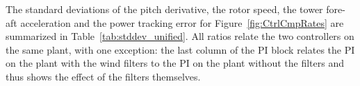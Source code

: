 
The standard deviations of the pitch derivative, the rotor speed, the tower fore-aft acceleration and the power tracking error for Figure~\ref{fig:CtrlCmpRates} are summarized in Table~\ref{tab:stddev_unified}. All ratios relate the two controllers on the same plant, with one exception: the last column of the PI block relates the PI on the plant with the wind filters to the PI on the plant without the filters and thus shows the effect of the filters themselves.

